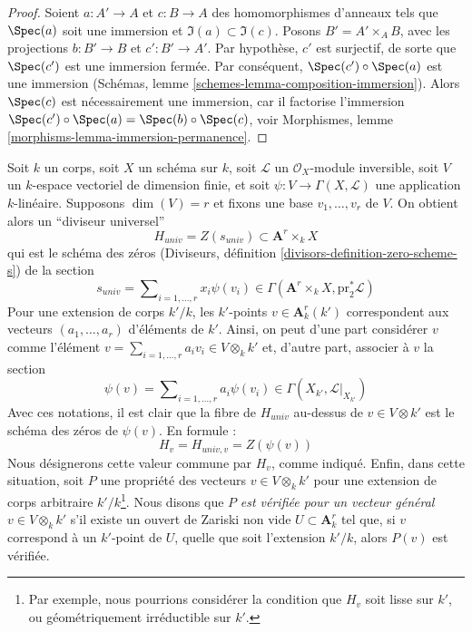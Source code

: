\begin{proof}
\medskip\noindent
Soient $a : A' \to A$ et $c : B \to A$ des homomorphismes d'anneaux tels que
$\Spec(a)$ soit une immersion et $\Im(a) \subset \Im(c)$.
Posons $B' = A' \times_A B$, avec les projections $b : B' \to B$
et $c' : B' \to A'$. Par hypothèse, $c'$
est surjectif, de sorte que $\Spec(c')$ est une immersion fermée.
Par conséquent, $\Spec(c') \circ \Spec(a)$ est une immersion
(Schémas, lemme \ref{schemes-lemma-composition-immersion}).
Alors $\Spec(c)$ est nécessairement une immersion, car il factorise
l'immersion $\Spec(c') \circ \Spec(a) = \Spec(b) \circ \Spec(c)$, voir
Morphismes, lemme \ref{morphisms-lemma-immersion-permanence}.
\end{proof}

\begin{situation}
\label{situation-family-divisors}
Soit $k$ un corps,
soit $X$ un schéma sur $k$,
soit $\mathcal{L}$ un $\mathcal{O}_X$-module inversible,
soit $V$ un $k$-espace vectoriel de dimension finie, et
soit $\psi : V \to \Gamma(X, \mathcal{L})$ une application $k$-linéaire.
Supposons $\dim(V) = r$ et fixons une base $v_1, \ldots, v_r$ de $V$.
On obtient alors un ``diviseur universel''
$$
H_{univ} = Z(s_{univ}) \subset  \mathbf{A}^r \times_k X
$$
qui est le schéma des zéros
(Diviseurs, définition \ref{divisors-definition-zero-scheme-s}) de la section
$$
s_{univ} = \sum\nolimits_{i = 1, \ldots, r} x_i \psi(v_i) \in
\Gamma(\mathbf{A}^r \times_k X, \text{pr}_2^*\mathcal{L})
$$
Pour une extension de corps $k'/k$, les $k'$-points $v \in \mathbf{A}^r_k(k')$
correspondent aux vecteurs $(a_1, \ldots, a_r)$ d'éléments de $k'$.
Ainsi, on peut d'une part considérer $v$ comme l'élément
$v = \sum_{i = 1, \ldots, r} a_i v_i \in V \otimes_k k'$
et, d'autre part, associer à $v$ la section
$$
\psi(v) = \sum\nolimits_{i = 1, \ldots, r} a_i \psi(v_i) \in
\Gamma(X_{k'}, \mathcal{L}|_{X_{k'}})
$$
Avec ces notations, il est clair que la fibre de $H_{univ}$ au-dessus de
$v \in V \otimes k'$ est le schéma des zéros de $\psi(v)$.
En formule :
$$
H_v = H_{univ, v} = Z(\psi(v))
$$
Nous désignerons cette valeur commune par $H_v$, comme indiqué. Enfin, dans
cette situation, soit $P$ une propriété des vecteurs $v \in V \otimes_k k'$
pour une extension de corps arbitraire $k'/k$\footnote{Par exemple, nous pourrions
considérer la condition que $H_v$ soit lisse sur $k'$, ou géométriquement
irréductible sur $k'$.}. Nous disons que $P$ {\it est vérifiée pour un vecteur général}
$v \in V \otimes_k k'$ s'il existe un ouvert de Zariski non vide
$U \subset \mathbf{A}^r_k$ tel que, si $v$ correspond à un $k'$-point
de $U$, quelle que soit l'extension $k'/k$, alors $P(v)$ est vérifiée.
\end{situation}

